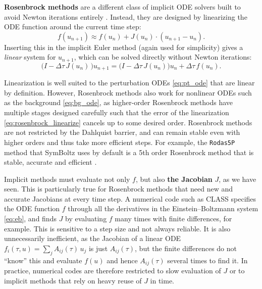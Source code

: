 \documentclass[USenglish, thumbmarks]{uiophdthesis} %
\newcommand\EB{Einstein--Boltzmann}
\begin{document}
\textbf{Rosenbrock methods} are a different class of implicit ODE solvers built to avoid Newton iterations entirely
\cite{rosenbrockGeneralImplicitProcesses1963,langRosenbrockWannerMethodsConstruction2021}.
Instead, they are designed by linearizing the ODE function around the current time step:
\begin{equation}
f(u_{n+1}) \approx f(u_n) + J(u_n) \cdot (u_{n+1}-u_n) .
\label{eq:rosenbrock_linearize}
\end{equation}
Inserting this in the implicit Euler method (again used for simplicity)
gives a \emph{linear} system for $u_{n+1}$,
which can be solved directly without Newton iterations:
\begin{equation}
\big( I - \Delta\tau \, J(u_n) \, \big) u_{n+1} = \big( I - \Delta\tau \, J(u_n) \big) u_n + \Delta\tau \, f(u_n) .
\label{eq:rosenbrock_linsolve}
\end{equation}

Linearization is well suited to the perturbation ODEs \eqref{eq:pt_ode} that are linear by definition.
However, Rosenbrock methods also work for nonlinear ODEs such as the background \eqref{eq:bg_ode},
as higher-order Rosenbrock methods have multiple stages designed carefully such that the error of the linearization \eqref{eq:rosenbrock_linearize} cancels up to some desired order.
Rosenbrock methods are not restricted by the Dahlquist barrier,
and can remain stable even with higher orders and thus take more efficient steps.
For example, the \texttt{Rodas5P} method that SymBoltz uses by default is a 5th order Rosenbrock method that is stable, accurate and efficient \cite{steinebachConstructionRosenbrockWanner2023}.

Implicit methods must evaluate not only $f$, but also \textbf{the Jacobian} $J$, as we have seen.
This is particularly true for Rosenbrock methods that need new and accurate Jacobians at every time step.
A numerical code such as CLASS
specifies the ODE function $f$ through all the derivatives in the \EB{} system \eqref{eq:eb},
and finds $J$ by evaluating $f$ many times with finite differences, for example.
This is sensitive to a step size and not always reliable.
It is also unnecessarily inefficient,
as the Jacobian of a linear ODE
$f_i(\tau,u) = \sum_j A_{ij}(\tau) \, u_j$ is just $A_{ij}(\tau)$,
but the finite differences do not \enquote{know} this
and evaluate $f(u)$ and hence $A_{ij}(\tau)$ several times to find it.
In practice, numerical codes are therefore restricted to slow evaluation of $J$
or to implicit methods that rely on heavy reuse of $J$ in time.
\end{document}
